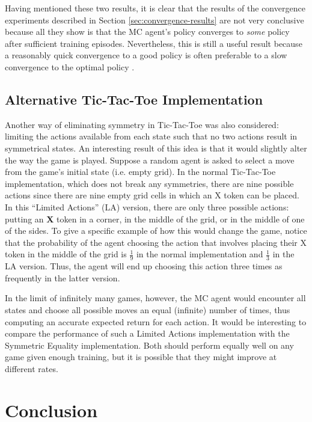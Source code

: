 \documentclass[11pt,a4paper]{report}
\begin{document}
Having mentioned these two results, it is clear that the results of the convergence experiments described in Section \ref{sec:convergence-results} are not very conclusive because all they show is that the MC agent's policy converges to \emph{some} policy after sufficient training episodes. Nevertheless, this is still a useful result because a reasonably quick convergence to a good policy is often preferable to a slow convergence to the optimal policy \cite{rl-a-survey}.


\section{Alternative Tic-Tac-Toe Implementation}

Another way of eliminating symmetry in Tic-Tac-Toe was also considered: limiting the actions available from each state such that no two actions result in symmetrical states. An interesting result of this idea is that it would slightly alter the way the game is played. Suppose a random agent is asked to select a move from the game's initial state (i.e. empty grid). In the normal Tic-Tac-Toe implementation, which does not break any symmetries, there are nine possible actions since there are nine empty grid cells in which an X token can be placed. In this ``Limited Actions'' (LA) version, there are only three possible actions: putting an \textbf{X} token in a corner, in the middle of the grid, or in the middle of one of the sides. To give a specific example of how this would change the game, notice that the probability of the agent choosing the action that involves placing their X token in the middle of the grid is $\frac{1}{9}$ in the normal implementation and $\frac{1}{3}$ in the LA version. Thus, the agent will end up choosing this action three times as frequently in the latter version.

In the limit of infinitely many games, however, the MC agent would encounter all states and choose all possible moves an equal (infinite) number of times, thus computing an accurate expected return for each action. It would be interesting to compare the performance of such a Limited Actions implementation with the Symmetric Equality implementation. Both should perform equally well on any game given enough training, but it is possible that they might improve at different rates.


\chapter{Conclusion}
\end{document}
